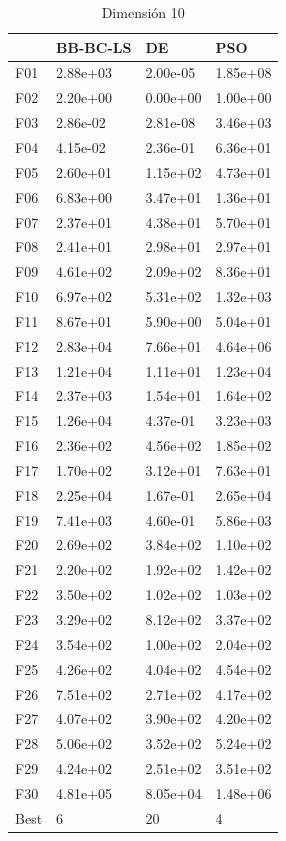 \begin{table}[H]
    \begin{minipage}{.5\linewidth}
      \caption{Dimensión 10}
      \centering
      \begin{tabular}{llll}
        \toprule
        {} &  BB-BC-LS &        DE &       PSO \\
        \midrule
        F01  &  2.88e+03 &  2.00e-05 &  1.85e+08 \\
        F02  &  2.20e+00 &  0.00e+00 &  1.00e+00 \\
        F03  &  2.86e-02 &  2.81e-08 &  3.46e+03 \\
        F04  &  4.15e-02 &  2.36e-01 &  6.36e+01 \\
        F05  &  2.60e+01 &  1.15e+02 &  4.73e+01 \\
        F06  &  6.83e+00 &  3.47e+01 &  1.36e+01 \\
        F07  &  2.37e+01 &  4.38e+01 &  5.70e+01 \\
        F08  &  2.41e+01 &  2.98e+01 &  2.97e+01 \\
        F09  &  4.61e+02 &  2.09e+02 &  8.36e+01 \\
        F10  &  6.97e+02 &  5.31e+02 &  1.32e+03 \\
        F11  &  8.67e+01 &  5.90e+00 &  5.04e+01 \\
        F12  &  2.83e+04 &  7.66e+01 &  4.64e+06 \\
        F13  &  1.21e+04 &  1.11e+01 &  1.23e+04 \\
        F14  &  2.37e+03 &  1.54e+01 &  1.64e+02 \\
        F15  &  1.26e+04 &  4.37e-01 &  3.23e+03 \\
        F16  &  2.36e+02 &  4.56e+02 &  1.85e+02 \\
        F17  &  1.70e+02 &  3.12e+01 &  7.63e+01 \\
        F18  &  2.25e+04 &  1.67e-01 &  2.65e+04 \\
        F19  &  7.41e+03 &  4.60e-01 &  5.86e+03 \\
        F20  &  2.69e+02 &  3.84e+02 &  1.10e+02 \\
        F21  &  2.20e+02 &  1.92e+02 &  1.42e+02 \\
        F22  &  3.50e+02 &  1.02e+02 &  1.03e+02 \\
        F23  &  3.29e+02 &  8.12e+02 &  3.37e+02 \\
        F24  &  3.54e+02 &  1.00e+02 &  2.04e+02 \\
        F25  &  4.26e+02 &  4.04e+02 &  4.54e+02 \\
        F26  &  7.51e+02 &  2.71e+02 &  4.17e+02 \\
        F27  &  4.07e+02 &  3.90e+02 &  4.20e+02 \\
        F28  &  5.06e+02 &  3.52e+02 &  5.24e+02 \\
        F29  &  4.24e+02 &  2.51e+02 &  3.51e+02 \\
        F30  &  4.81e+05 &  8.05e+04 &  1.48e+06 \\
        Best &         6 &        20 &         4 \\
        \bottomrule
        \end{tabular}
        

\end{minipage}
\end{table}
